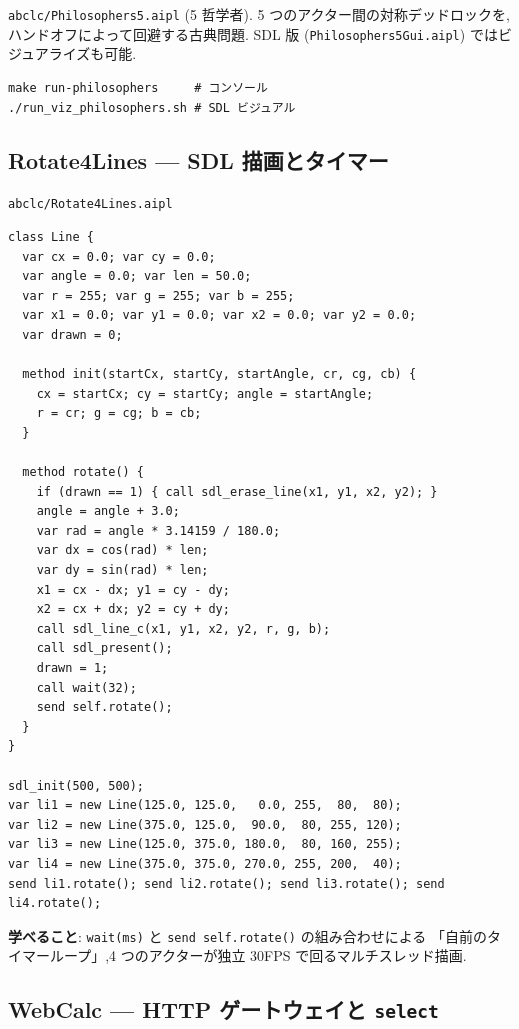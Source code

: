 \documentclass[11pt,a4paper]{article}
\begin{document}
\texttt{abclc/Philosophers5.aipl} (5 哲学者).
5 つのアクター間の対称デッドロックを,ハンドオフによって回避する古典問題.
SDL 版 (\texttt{Philosophers5Gui.aipl}) ではビジュアライズも可能.

\begin{lstlisting}[language=shell]
make run-philosophers     # コンソール
./run_viz_philosophers.sh # SDL ビジュアル
\end{lstlisting}

\subsection{Rotate4Lines --- SDL 描画とタイマー}

\texttt{abclc/Rotate4Lines.aipl}

\begin{lstlisting}
class Line {
  var cx = 0.0; var cy = 0.0;
  var angle = 0.0; var len = 50.0;
  var r = 255; var g = 255; var b = 255;
  var x1 = 0.0; var y1 = 0.0; var x2 = 0.0; var y2 = 0.0;
  var drawn = 0;

  method init(startCx, startCy, startAngle, cr, cg, cb) {
    cx = startCx; cy = startCy; angle = startAngle;
    r = cr; g = cg; b = cb;
  }

  method rotate() {
    if (drawn == 1) { call sdl_erase_line(x1, y1, x2, y2); }
    angle = angle + 3.0;
    var rad = angle * 3.14159 / 180.0;
    var dx = cos(rad) * len;
    var dy = sin(rad) * len;
    x1 = cx - dx; y1 = cy - dy;
    x2 = cx + dx; y2 = cy + dy;
    call sdl_line_c(x1, y1, x2, y2, r, g, b);
    call sdl_present();
    drawn = 1;
    call wait(32);
    send self.rotate();
  }
}

sdl_init(500, 500);
var li1 = new Line(125.0, 125.0,   0.0, 255,  80,  80);
var li2 = new Line(375.0, 125.0,  90.0,  80, 255, 120);
var li3 = new Line(125.0, 375.0, 180.0,  80, 160, 255);
var li4 = new Line(375.0, 375.0, 270.0, 255, 200,  40);
send li1.rotate(); send li2.rotate(); send li3.rotate(); send li4.rotate();
\end{lstlisting}

\textbf{学べること}: \texttt{wait(ms)} と \texttt{send self.rotate()} の組み合わせによる
「自前のタイマーループ」,4 つのアクターが独立 30FPS で回るマルチスレッド描画.

\subsection{WebCalc --- HTTP ゲートウェイと \texttt{select}}
\end{document}
